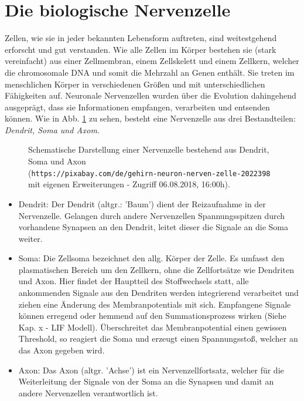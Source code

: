 \section{Die biologische Nervenzelle}
\label{sec:neuro_nervenzelle}
	Zellen, wie sie in jeder bekannten Lebensform auftreten, sind weitestgehend erforscht und gut verstanden. Wie alle Zellen im Körper bestehen sie (stark vereinfacht) aus einer Zellmembran, einem Zellskelett und einem Zellkern, welcher die chromosomale DNA und somit die Mehrzahl an Genen enthält. Sie treten im menschlichen Körper in verschiedenen Größen und mit unterschiedlichen Fähigkeiten auf. Neuronale Nervenzellen wurden über die Evolution dahingehend ausgeprägt, dass sie Informationen empfangen, verarbeiten und entsenden können. Wie in Abb. \ref{fig:neuron} zu sehen, besteht eine Nervenzelle aus drei Bestandteilen: \textit{Dendrit, Soma und Axom}.
	\begin{figure}[H] %
		\centering
		\def\svgwidth{12cm}
		
		\caption{Schematische Darstellung einer Nervenzelle bestehend aus Dendrit, Soma und Axon\\(\texttt{https://pixabay.com/de/gehirn-neuron-nerven-zelle-2022398} mit eigenen Erweiterungen - Zugriff 06.08.2018, 16:00h).}
		\label{fig:neuron}
	\end{figure}
	\begin{itemize}
		\item Dendrit:
			\subitem Der Dendrit (altgr.: 'Baum') dient der Reizaufnahme in der Nervenzelle. Gelangen durch andere Nervenzellen Spannungsspitzen durch vorhandene Synapsen an den Dendrit, leitet dieser die Signale an die Soma weiter.
		\item Soma:
			\subitem Die Zellsoma bezeichnet den allg. Körper der Zelle. Es umfasst den plasmatischen Bereich um den Zellkern, ohne die Zellfortsätze wie Dendriten und Axon. Hier findet der Hauptteil des Stoffwechsels statt, alle ankommenden Signale aus den Dendriten werden integrierend verarbeitet und ziehen eine Änderung des Membranpotentials mit sich. Empfangene Signale können erregend oder hemmend auf den Summationsprozess wirken (Siehe Kap. x - LIF Modell). Überschreitet das Membranpotential einen gewissen Threshold, so reagiert die Soma und erzeugt einen Spannungsstoß, welcher an das Axon gegeben wird.
		\item Axon:
			\subitem Das Axon (altgr. 'Achse') ist ein Nervenzellfortsatz, welcher für die Weiterleitung der Signale von der Soma an die Synapsen und damit an andere Nervenzellen verantwortlich ist.
	\end{itemize}
